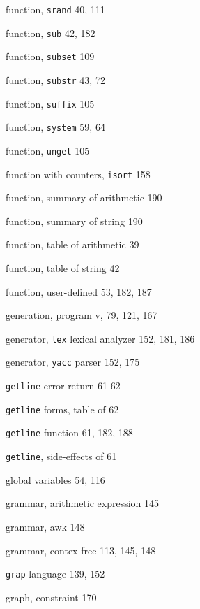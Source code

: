 \begin{multicols}{3}
\hangindent=3pc  function, \verb'srand' 40, 111

\hangindent=3pc  function, \verb'sub' 42, 182

\hangindent=3pc  function, \verb'subset' 109

\hangindent=3pc  function, \verb'substr' 43, 72

\hangindent=3pc  function, \verb'suffix' 105

\hangindent=3pc  function, \verb'system' 59, 64

\hangindent=3pc  function, \verb'unget' 105

\hangindent=3pc  function with counters, \verb'isort' 158

\hangindent=3pc  function, summary of arithmetic 190

\hangindent=3pc  function, summary of string 190

\hangindent=3pc  function, table of arithmetic 39

\hangindent=3pc  function, table of string 42

\hangindent=3pc  function, user-defined 53, 182, 187

\hangindent=3pc  generation, program v, 79, 121, 167

\hangindent=3pc  generator, \verb'lex' lexical analyzer 152, 181, 186

\hangindent=3pc  generator, \verb'yacc' parser 152, 175

\hangindent=3pc  \verb'getline' error return 61-62

\hangindent=3pc  \verb'getline' forms, table of 62

\hangindent=3pc  \verb'getline' function 61, 182, 188

\hangindent=3pc  \verb'getline', side-effects of 61

\hangindent=3pc  global variables 54, 116

\hangindent=3pc  grammar, arithmetic expression 145

\hangindent=3pc  grammar, awk 148

\hangindent=3pc  grammar, contex-free 113, 145, 148

\hangindent=3pc  \verb'grap' language 139, 152

\hangindent=3pc  graph, constraint 170


\end{multicols}
